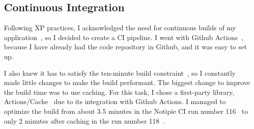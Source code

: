 \subsection{Continuous Integration}\label{sec:continuous-integration}

Following \ac{XP} practices,
I acknowledged the need for
continuous builds of my application~\cite[pp.~49-50]{beck_extreme_2004},
so I decided to create a \ac{CI} pipeline.
I went with Github Actions~\cite{github_inc_github_2022-1},
because I have already had
the code repository in Github,
and it was easy to set up.

I also knew it has to satisfy
the ten-minute build constraint~\cite[p.~49]{beck_extreme_2004},
so I constantly made little changes
to make the build performant.
The biggest change to improve
the build time was to use caching.
For this task, I chose a first-party library,
Actions/Cache~\cite{sharma_actionscache_2022}
due to its integration with Github Actions.
I managed to optimize the build
from about 3.5 minutes
in the Notipie \ac{CI} run number 116~
to only 2 minutes after caching
in the run number 118~.

